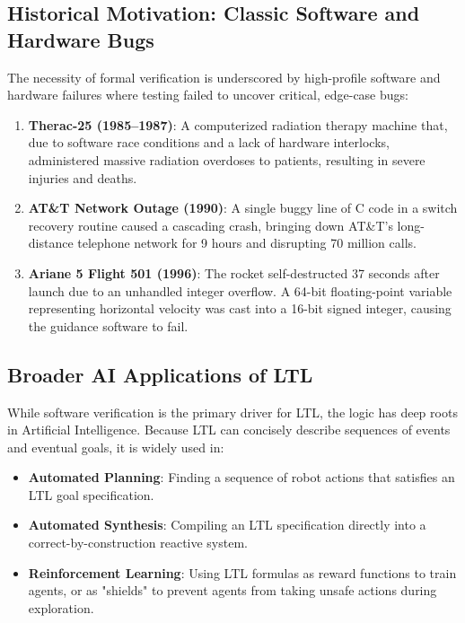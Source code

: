 \subsection{Historical Motivation: Classic Software and Hardware Bugs}
The necessity of formal verification is underscored by high-profile software and hardware failures where testing failed to uncover critical, edge-case bugs:
\begin{enumerate}
    \item \textbf{Therac-25 (1985--1987)}: A computerized radiation therapy machine that, due to software race conditions and a lack of hardware interlocks, administered massive radiation overdoses to patients, resulting in severe injuries and deaths.
    \item \textbf{AT\&T Network Outage (1990)}: A single buggy line of C code in a switch recovery routine caused a cascading crash, bringing down AT\&T's long-distance telephone network for 9 hours and disrupting 70 million calls.
    \item \textbf{Ariane 5 Flight 501 (1996)}: The rocket self-destructed 37 seconds after launch due to an unhandled integer overflow. A 64-bit floating-point variable representing horizontal velocity was cast into a 16-bit signed integer, causing the guidance software to fail.
\end{enumerate}

\subsection{Broader AI Applications of LTL}
While software verification is the primary driver for LTL, the logic has deep roots in Artificial Intelligence. Because LTL can concisely describe sequences of events and eventual goals, it is widely used in:
\begin{itemize}
    \item \textbf{Automated Planning}: Finding a sequence of robot actions that satisfies an LTL goal specification.
    \item \textbf{Automated Synthesis}: Compiling an LTL specification directly into a correct-by-construction reactive system.
    \item \textbf{Reinforcement Learning}: Using LTL formulas as reward functions to train agents, or as "shields" to prevent agents from taking unsafe actions during exploration.
\end{itemize}

